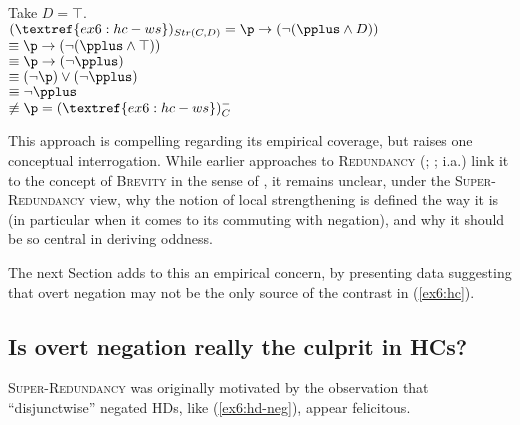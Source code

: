 \begin{exe}
{		Take $D=\top$.\\
		$(\textref{ex6:hc-ws})_{Str(C, D)} =  \p \rightarrow (\neg(\pplus \wedge D)) $\\
		 $\equiv \p \rightarrow (\neg(\pplus \wedge \top))$\\
		 $\equiv \p \rightarrow (\neg\pplus)$\\
		 $\equiv (\neg\p) \vee (\neg\pplus)$\\
		 $\equiv \neg\pplus$\\
		 $\not\equiv \p = (\textref{ex6:hc-ws})^-_C$\\
		
	}
\end{exe}


This approach is compelling regarding its empirical coverage, but raises one conceptual interrogation. While earlier approaches to \textsc{Redundancy} (; ;  i.a.) link it to the concept of \textsc{Brevity} in the sense of \citet{Grice1975}, it remains unclear, under the \textsc{Super-Redundancy} view, why the notion of local strengthening is defined the way it is (in particular when it comes to its commuting with negation), and why it should be so central in deriving oddness. 

The next Section adds to this an empirical concern, by presenting data suggesting that overt negation may not be the only source of the contrast in (\ref{ex6:hc}).



\subsection{Is overt negation really the culprit in HCs?}

\textsc{Super-Redundancy} was originally motivated by the observation that ``disjunctwise'' negated HDs, like (\ref{ex6:hd-neg}), appear felicitous. 

\begin{exe}
	\label{ex6:hd-neg}
\end{exe}


